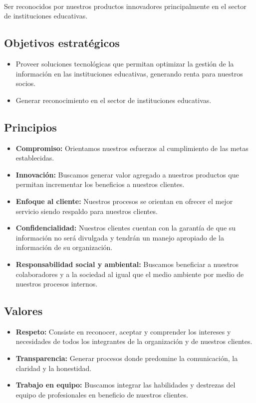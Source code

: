     \paragraph*{}
    Ser reconocidos por nuestros productos innovadores principalmente en el sector de instituciones educativas.
  
  \subsection{Objetivos estratégicos}
    \begin{itemize}
  	  \item Proveer soluciones tecnológicas que permitan optimizar la gestión de la información en las instituciones educativas, generando renta para nuestros socios.
      \item Generar reconocimiento en el sector de instituciones educativas.
    \end{itemize}

  \subsection{Principios}
    \begin{itemize}
    	\item \textbf{Compromiso:} Orientamos nuestros esfuerzos al cumplimiento de las metas establecidas.
    	\item \textbf{Innovación:} Buscamos generar valor agregado a nuestros productos que permitan incrementar los beneficios a nuestros clientes.
    	\item \textbf{Enfoque al cliente:} Nuestros procesos se orientan en ofrecer el mejor servicio siendo respaldo para nuestros clientes.
    	\item \textbf{Confidencialidad:} Nuestros clientes cuentan con la garantía de que su información no será divulgada y tendrán un manejo apropiado de la información de su organización.
    	\item \textbf{Responsabilidad social y ambiental:} Buscamos beneficiar a nuestros colaboradores y a la sociedad al igual que el medio ambiente por medio de nuestros procesos internos.
    \end{itemize}
    
    \subsection{Valores}
      \begin{itemize}
		\item \textbf{Respeto:} Consiste en reconocer, aceptar y comprender los intereses y necesidades de todos los integrantes de la organización y de nuestros clientes.
		\item \textbf{Transparencia:} Generar procesos donde predomine la comunicación, la claridad y la honestidad.
		\item \textbf{Trabajo en equipo:} Buscamos integrar las habilidades y destrezas del equipo de profesionales en beneficio de nuestros clientes.
    \end{itemize}

